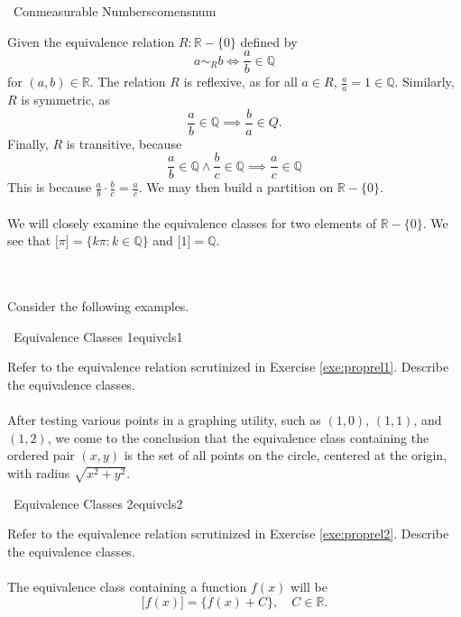         \begin{example}{\Difficulty\,\Difficulty\,\,Conmeasurable Numbers}{comensnum}
        
            Given the equivalence relation \(R:\mathbb{R}-\{0\}\) defined by
            \begin{equation*}
                a\sim_Rb\iff\frac{a}{b}\in\mathbb{Q} 
            \end{equation*}
            for \((a,b)\in\mathbb{R}\). The relation \(R\) is reflexive, as for all \(a\in R\), \(\frac{a}{a}=1\in\mathbb{Q}\). Similarly, \(R\) is symmetric, as
            \begin{equation*}
                \frac{a}{b}\in\mathbb{Q}\implies\frac{b}{a}\in Q.
            \end{equation*}
            Finally, \(R\) is transitive, because
            \begin{equation*}
                \frac{a}{b}\in\mathbb{Q}\wedge\frac{b}{c}\in\mathbb{Q}\implies\frac{a}{c}\in\mathbb{Q}
            \end{equation*}
            This is because \(\frac{a}{b}\cdot\frac{b}{c}=\frac{a}{c}\). We may then build a partition on \(\mathbb{R}-\{0\}\).
            \\
            \\
            We will closely examine the equivalence classes for two elements of \(\mathbb{R}-\{0\}\). We see that \({[}\pi{]}=\{k\pi:k\in\mathbb{Q}\}\) and \({[}1{]}=\mathbb{Q}\).
        \end{example}
        \vphantom
        \\
        \\
        Consider the following examples.
        \begin{exercise}{\Difficulty\,\Difficulty\,\,Equivalence Classes 1}{equivcls1}
        
            Refer to the equivalence relation scrutinized in Exercise \ref{exe:proprel1}. Describe the equivalence classes.
            \\
            \\
            After testing various points in a graphing utility, such as \((1,0)\), \((1,1)\), and \((1,2)\), we come to the conclusion that the equivalence class containing the ordered pair \((x,y)\) is the set of all points on the circle, centered at the origin, with radius \(\sqrt{x^2+y^2}\).
        \end{exercise}
        \begin{exercise}{\Difficulty\,\Difficulty\,\,Equivalence Classes 2}{equivcls2}
        
            Refer to the equivalence relation scrutinized in Exercise \ref{exe:proprel2}. Describe the equivalence classes.
            \\
            \\
            The equivalence class containing a function \(f(x)\) will be
            \begin{equation*}
                {[}f(x){]}=\{f(x)+C\},\quad C\in\mathbb{R}.
            \end{equation*}
            
        \end{exercise}
    \pagebreak
    
